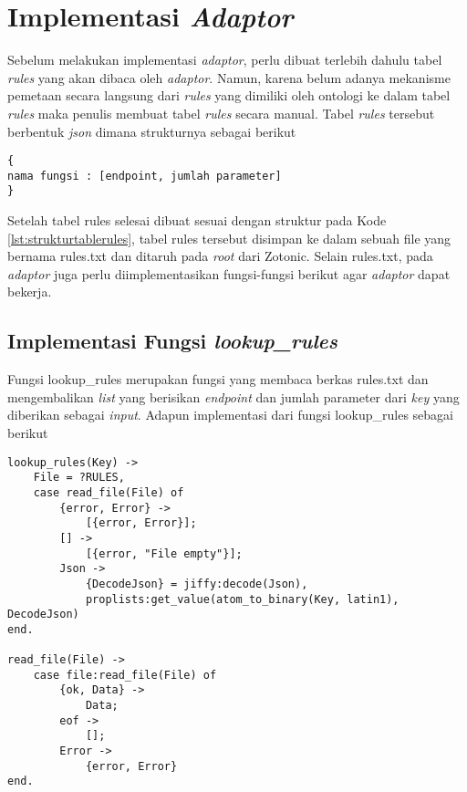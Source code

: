 \section{Implementasi \textit{Adaptor}}

Sebelum melakukan implementasi \textit{adaptor}, perlu dibuat terlebih dahulu tabel \textit{rules} yang akan dibaca oleh \textit{adaptor}. Namun, karena belum adanya mekanisme pemetaan secara langsung dari \textit{rules} yang dimiliki oleh ontologi ke dalam tabel \textit{rules} maka penulis membuat tabel \textit{rules} secara manual. Tabel \textit{rules} tersebut berbentuk \textit{json} dimana strukturnya sebagai berikut

\begin{minipage}{\linewidth}
\begin{lstlisting}[caption={Struktur tabel \textit{rules}},label={lst:strukturtablerules}]
{
nama fungsi : [endpoint, jumlah parameter]
}
\end{lstlisting}
\end{minipage}

Setelah tabel rules selesai dibuat sesuai dengan struktur pada Kode \ref{lst:strukturtablerules}, tabel rules tersebut disimpan ke dalam sebuah file yang bernama rules.txt dan ditaruh pada \textit{root} dari Zotonic. Selain rules.txt, pada \textit{adaptor} juga perlu diimplementasikan fungsi-fungsi berikut agar \textit{adaptor} dapat bekerja.

\subsection{Implementasi Fungsi \textit{lookup\_rules}}

Fungsi lookup\_rules merupakan fungsi yang membaca berkas rules.txt dan mengembalikan \textit{list} yang berisikan \textit{endpoint} dan jumlah parameter dari \textit{key} yang diberikan sebagai \textit{input}. Adapun implementasi dari fungsi lookup\_rules sebagai berikut

\begin{minipage}{\linewidth}
\begin{lstlisting}[caption={Implementasi fungsi lookup\_rules},label={lst:lookuprules}]
lookup_rules(Key) ->
	File = ?RULES,
	case read_file(File) of
		{error, Error} ->
			[{error, Error}];
		[] ->
			[{error, "File empty"}];
		Json ->
			{DecodeJson} = jiffy:decode(Json),
			proplists:get_value(atom_to_binary(Key, latin1), DecodeJson)
end.

read_file(File) ->
	case file:read_file(File) of
		{ok, Data} ->
			Data;
		eof ->
			[];
		Error ->
			{error, Error}
end.
\end{lstlisting}
\end{minipage}

